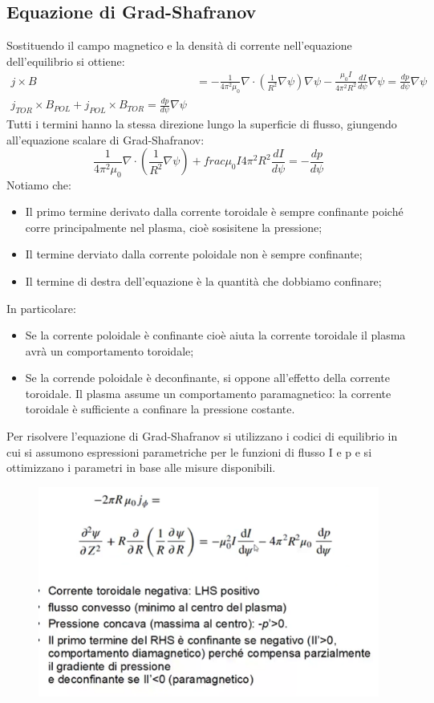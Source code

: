 \documentclass{article}
\begin{document}
\subsection{Equazione di Grad-Shafranov}
Sostituendo il campo magnetico e la densità di corrente nell'equazione dell'equilibrio si ottiene:\begin{align*}
    j\times B&=-\frac{1}{4\pi^{2}\mu_{0}}\nabla\cdot\left(\frac{1}{R^{2}}\nabla\psi\right)\nabla\psi-\frac{\mu_{0}I}{4\pi^{2}R^{2}}\frac{dI}{d\psi}\nabla\psi=\frac{dp}{d\psi}\nabla\psi \\
    j_{TOR}\times B_{POL}+j_{POL}\times B_{TOR}=\frac{dp}{d\psi}\nabla\psi
\end{align*}
Tutti i termini hanno la stessa direzione lungo la superficie di flusso, giungendo all'equazione scalare di Grad-Shafranov:
\textbf{\begin{equation*}
    \frac{1}{4\pi^{2}\mu_{0}}\nabla\cdot\left(\frac{1}{R^{2}}\nabla\psi \right)+frac{\mu_{0}I}{4\pi^{2}R^{2}}\frac{dI}{d\psi}=-\frac{dp}{d\psi}
\end{equation*}}
Notiamo che:\begin{itemize}
    \item Il primo termine derivato dalla corrente toroidale è sempre confinante poiché corre principalmente nel plasma, cioè sosisitene la pressione;
    \item Il termine derviato dalla corrente poloidale non è sempre confinante;
    \item Il termine di destra dell'equazione è la quantità che dobbiamo confinare;
\end{itemize}
In particolare:\begin{itemize}
    \item Se la corrente poloidale è confinante cioè aiuta la corrente toroidale il plasma avrà un comportamento toroidale;
    \item Se la corrende poloidale è deconfinante, si oppone all'effetto della corrente toroidale. Il plasma assume un comportamento paramagnetico: la corrente toroidale è sufficiente a confinare la pressione costante.
\end{itemize}
Per risolvere l'equazione di Grad-Shafranov si utilizzano i codici di equilibrio in cui si assumono espressioni parametriche per le funzioni di flusso I e p e si ottimizzano i parametri in base alle misure disponibili.
\begin{figure}
    \centering
    \includegraphics[scale=0.4]{2022-06-26-16-35-40.png}%
\end{figure}
\end{document}
